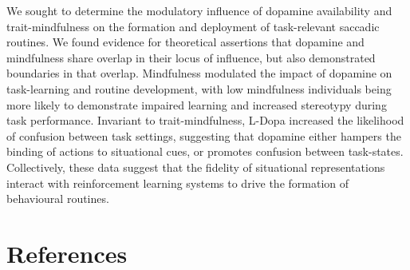 \documentclass{article}
\begin{document}
We sought to determine the modulatory influence of dopamine availability
and trait-mindfulness on the formation and deployment of task-relevant
saccadic routines. We found evidence for theoretical assertions that
dopamine and mindfulness share overlap in their locus of influence, but
also demonstrated boundaries in that overlap. Mindfulness modulated the
impact of dopamine on task-learning and routine development, with low
mindfulness individuals being more likely to demonstrate impaired
learning and increased stereotypy during task performance. Invariant to
trait-mindfulness, L-Dopa increased the likelihood of confusion between
task settings, suggesting that dopamine either hampers the binding of
actions to situational cues, or promotes confusion between task-states.
Collectively, these data suggest that the fidelity of situational
representations interact with reinforcement learning systems to drive
the formation of behavioural routines.

\hypertarget{references}{%
\section*{References}\label{references}}
\end{document}
